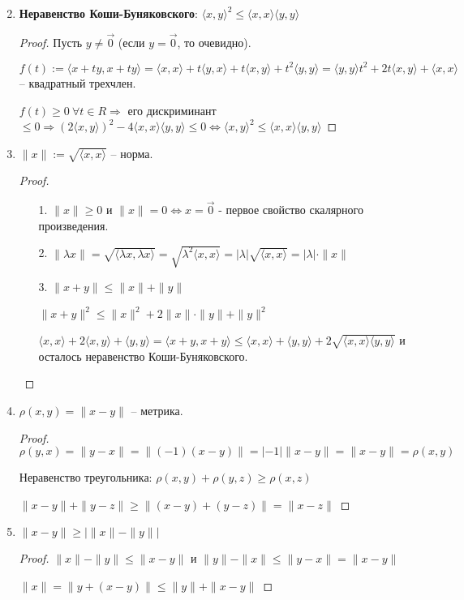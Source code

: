\begin{statement}
    \begin{enumerate}
        \item[]
        \item \textbf{Неравенство Коши-Буняковского}: $\langle x, y\rangle^2\leq \langle x, x\rangle\langle y, y\rangle$
        \begin{proof}
            Пусть $y\neq \vec{0}$ (если $y=\vec{0}$, то очевидно).

            $f(t):=\langle x+ty, x+ty\rangle=\langle x, x\rangle+t\langle y, x\rangle+t\langle x, y\rangle+t^2\langle y, y\rangle=\langle y, y\rangle t^2+2t\langle x, y\rangle+\langle x, x\rangle$ – квадратный трехчлен.

            $f(t)\geq 0\ \forall t\in R\Rightarrow$ его дискриминант $\leq 0\Rightarrow (2\langle x, y\rangle)^2-4\langle x, x\rangle\langle y, y\rangle\leq 0\Leftrightarrow \langle x, y\rangle^2\leq \langle x, x\rangle\langle y, y\rangle$
        \end{proof}
        \item $\|x\|:=\sqrt{\langle x, x\rangle}$ – норма.
        \begin{proof}~
            \begin{enumerate}
                \item[1.] $\|x\|\geq 0$ и $\|x\|=0\Leftrightarrow x=\vec{0}$ - первое свойство скалярного произведения.
                \item[2.] $\|\lambda x\|=\sqrt{\langle\lambda x,\lambda x\rangle}=\sqrt{\lambda^2\langle x, x\rangle}=|\lambda|\sqrt{\langle x, x\rangle}=|\lambda|\cdot \|x\|$
                \item[3.] $\|x+y\|\leq \|x\|+\|y\|$

                $\|x+y\|^2\leq \|x\|^2+2\|x\|\cdot \|y\|+\|y\|^2$

                $\langle x, x\rangle+2\langle x, y\rangle+\langle y, y\rangle=\langle x+y, x+y\rangle\leq \langle x, x\rangle+\langle y, y\rangle+2\sqrt{\langle x, x\rangle\langle y, y\rangle}$ и осталось неравенство Коши-Буняковского.
            \end{enumerate}
        \end{proof}
        \item $\rho(x, y)=\|x-y\|$ – метрика.
        \begin{proof}
            $\rho(y, x)=\|y-x\|=\|(-1)(x-y)\|=|-1|\|x-y\|=\|x-y\|=\rho(x, y)$

            Неравенство треугольника: $\rho(x, y)+\rho(y, z)\geq \rho(x, z)$

            $\|x-y\|+\|y-z\|\geq \|(x-y)+(y-z)\|=\|x-z\|$
        \end{proof}
        \item $\|x-y\|\geq |\|x\|-\|y\||$

        \begin{proof}
            $\|x\|-\|y\|\leq \|x-y\|$ и $\|y\|-\|x\|\leq \|y-x\|=\|x-y\|$ 

            $\|x\|=\|y+(x-y)\|\leq \|y\|+\|x-y\|$
        \end{proof}
    \end{enumerate}
\end{statement}

